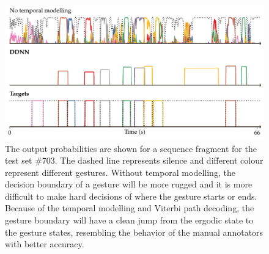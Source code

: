 \begin{figure}[t]
  \centering
  \includegraphics[width=.7\textwidth]{images/WO_HMM_703.pdf}
  \caption{The output probabilities are shown for a sequence fragment for the test set \#703. The dashed line represents silence and different colour represent different gestures. Without temporal modelling, the decision boundary of a gesture will be more rugged and it is more difficult to make hard decisions of where the gesture starts or ends. Because of the temporal modelling and Viterbi path decoding, the gesture boundary will have a clean jump from the ergodic state to the gesture states, resembling the behavior of the manual annotators with better accuracy.}
    \label{fig:temporalModellingComparision}
\end{figure}


